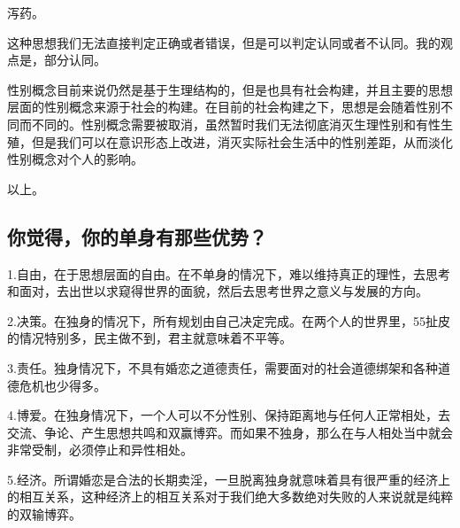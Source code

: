 \documentclass{ctexart}
\begin{document}
	泻药。
	
	这种思想我们无法直接判定正确或者错误，但是可以判定认同或者不认同。我的观点是，部分认同。
	
	性别概念目前来说仍然是基于生理结构的，但是也具有社会构建，并且主要的思想层面的性别概念来源于社会的构建。在目前的社会构建之下，思想是会随着性别不同而不同的。性别概念需要被取消，虽然暂时我们无法彻底消灭生理性别和有性生殖，但是我们可以在意识形态上改进，消灭实际社会生活中的性别差距，从而淡化性别概念对个人的影响。
	
	以上。
	
	
	\subsection{你觉得，你的单身有那些优势？}
	
	1.自由，在于思想层面的自由。在不单身的情况下，难以维持真正的理性，去思考和面对，去出世以求窥得世界的面貌，然后去思考世界之意义与发展的方向。
	
	2.决策。在独身的情况下，所有规划由自己决定完成。在两个人的世界里，55扯皮的情况特别多，民主做不到，君主就意味着不平等。
	
	3.责任。独身情况下，不具有婚恋之道德责任，需要面对的社会道德绑架和各种道德危机也少得多。
	
	4.博爱。在独身情况下，一个人可以不分性别、保持距离地与任何人正常相处，去交流、争论、产生思想共鸣和双赢博弈。而如果不独身，那么在与人相处当中就会非常受制，必须停止和异性相处。
	
	5.经济。所谓婚恋是合法的长期卖淫，一旦脱离独身就意味着具有很严重的经济上的相互关系，这种经济上的相互关系对于我们绝大多数绝对失败的人来说就是纯粹的双输博弈。
	
	
\end{document}
